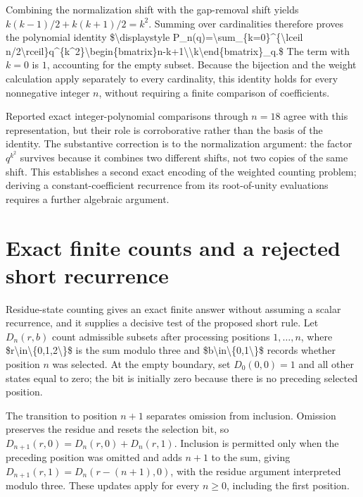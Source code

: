 \documentclass[11pt]{article}
\begin{document}
Combining the normalization shift with the gap-removal shift yields $k(k-1)/2+k(k+1)/2=k^2$. Summing over cardinalities therefore proves the polynomial identity
\$\textbackslash{}displaystyle P\_n(q)=\textbackslash{}sum\_\{k=0\}\textasciicircum{}\{\textbackslash{}lceil n/2\textbackslash{}rceil\}q\textasciicircum{}\{k\textasciicircum{}2\}\textbackslash{}begin\{bmatrix\}n-k+1\textbackslash{}\textbackslash{}k\textbackslash{}end\{bmatrix\}\_q.\$
The term with $k=0$ is $1$, accounting for the empty subset. Because the bijection and the weight calculation apply separately to every cardinality, this identity holds for every nonnegative integer $n$, without requiring a finite comparison of coefficients.

Reported exact integer-polynomial comparisons through $n=18$ agree with this representation, but their role is corroborative rather than the basis of the identity. The substantive correction is to the normalization argument: the factor $q^{k^2}$ survives because it combines two different shifts, not two copies of the same shift. This establishes a second exact encoding of the weighted counting problem; deriving a constant-coefficient recurrence from its root-of-unity evaluations requires a further algebraic argument.

\section{Exact finite counts and a rejected short recurrence}
Residue-state counting gives an exact finite answer without assuming a scalar recurrence, and it supplies a decisive test of the proposed short rule. Let $D_n(r,b)$ count admissible subsets after processing positions $1,\ldots,n$, where \$r\textbackslash{}in\textbackslash{}\{0,1,2\textbackslash{}\}\$ is the sum modulo three and \$b\textbackslash{}in\textbackslash{}\{0,1\textbackslash{}\}\$ records whether position $n$ was selected. At the empty boundary, set $D_0(0,0)=1$ and all other states equal to zero; the bit is initially zero because there is no preceding selected position.

The transition to position $n+1$ separates omission from inclusion. Omission preserves the residue and resets the selection bit, so $D_{n+1}(r,0)=D_n(r,0)+D_n(r,1)$. Inclusion is permitted only when the preceding position was omitted and adds $n+1$ to the sum, giving $D_{n+1}(r,1)=D_n(r-(n+1),0)$, with the residue argument interpreted modulo three. These updates apply for every $n\geq0$, including the first position.
\end{document}
